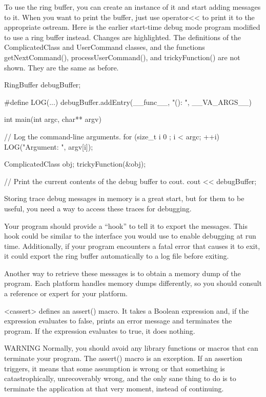 
To use the ring buffer, you can create an instance of it and start adding messages to it. When you want to print the buffer, just use operator<{}< to print it to the appropriate ostream. Here is the earlier start-time debug mode program modified to use a ring buffer instead. Changes are highlighted. The definitions of the ComplicatedClass and UserCommand classes, and the functions getNextCommand(), processUserCommand(), and trickyFunction() are not shown. They are the same as before.

\begin{cpp}
RingBuffer debugBuffer;

#define LOG(...) debugBuffer.addEntry(__func__, "(): ", __VA_ARGS__)

int main(int argc, char** argv)
{
    // Log the command-line arguments.
    for (size_t i { 0 }; i < argc; ++i) {
        LOG("Argument: ", argv[i]);
    }

    ComplicatedClass obj;
    trickyFunction(&obj);

    // Print the current contents of the debug buffer to cout.
    cout << debugBuffer;
}
\end{cpp}


Storing trace debug messages in memory is a great start, but for them to be useful, you need a way to access these traces for debugging.

Your program should provide a “hook” to tell it to export the messages. This hook could be similar to the interface you would use to enable debugging at run time. Additionally, if your program encounters a fatal error that causes it to exit, it could export the ring buffer automatically to a log file before exiting.

Another way to retrieve these messages is to obtain a memory dump of the program. Each platform handles memory dumps differently, so you should consult a reference or expert for your platform.


<cassert> defines an assert() macro. It takes a Boolean expression and, if the expression evaluates to false, prints an error message and terminates the program. If the expression evaluates to true, it does nothing.

\begin{myWarning}{WARNING}
Normally, you should avoid any library functions or macros that can terminate your program. The assert() macro is an exception. If an assertion triggers, it means that some assumption is wrong or that something is catastrophically, unrecoverably wrong, and the only sane thing to do is to terminate the application at that very moment, instead of continuing.
\end{myWarning}

